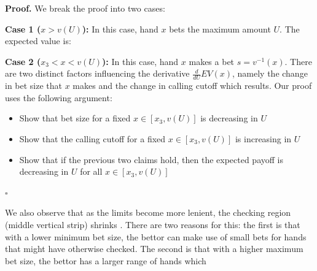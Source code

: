 \documentclass[a4paper,12pt]{article}
\theoremstyle{plain}
\theoremstyle{definition}
\newenvironment{customproof}[1][Proof]{\noindent\textbf{#1.} }{\hfill$\square$\vspace{1em}}
\begin{document}
\begin{customproof}
    We break the proof into two cases:

    \textbf{Case 1 ($x > v(U)$):} In this case, hand $x$ bets the maximum amount $U$. The expected value is:

    \textbf{Case 2 ($x_3 < x < v(U)$):} In this case, hand $x$ makes a bet $s = v^{-1}(x)$. There are two distinct factors influencing the derivative $\frac{d}{dU} EV(x)$, namely the change in bet size that $x$ makes and the change in calling cutoff which results. Our proof uses the following argument:
    \begin{itemize}
        \item Show that bet size for a fixed $x \in [x_3, v(U)]$ is decreasing in $U$
        \item Show that the calling cutoff for a fixed $x \in [x_3, v(U)]$ is increasing in $U$
        \item Show that if the previous two claims hold, then the expected payoff is decreasing in $U$ for all $x \in [x_3, v(U)]$
    \end{itemize}
    
    

    

\end{customproof}

We also observe that as the limits become more lenient, the checking region (middle vertical strip) shrinks . There are two reasons for this: the first is that with a lower minimum bet size, the bettor can make use of small bets for hands that might have otherwise checked. The second is that with a higher maximum bet size, the bettor has a larger range of hands which 
\end{document}
